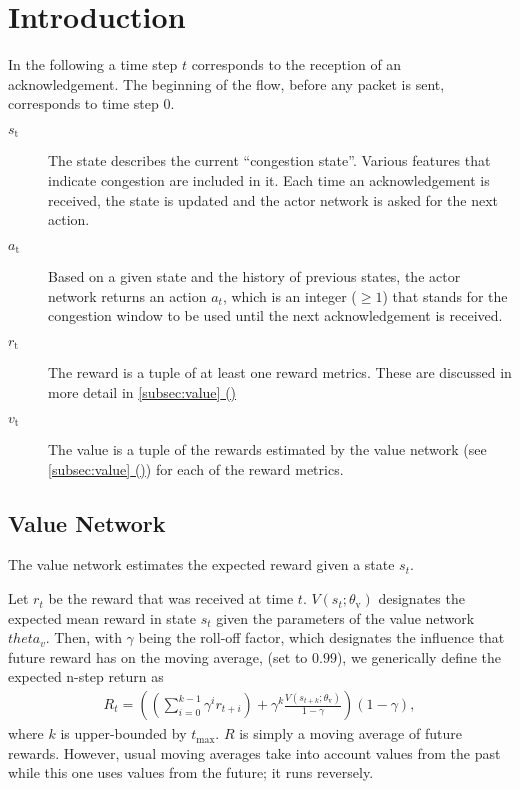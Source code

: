 \documentclass[sigconf]{acmart}
\newcommand*{\fullref}[1]{\hyperref[{#1}]{\autoref*{#1} (\nameref*{#1})}} %
\begin{document}




\maketitle

\section{Introduction}

In the following a time step $t$ corresponds to the reception of an acknowledgement. The beginning of the flow, before any packet is sent, corresponds to time step $0$.

\begin{description}
\item[$\textit{s}_\text{t}$] The state  describes the current ``congestion state''. Various features that indicate congestion are included in it. Each time an acknowledgement is received, the state is updated and the actor network is asked for the next action. 
\item[$\textit{a}_\text{t}$] Based on a given state and the history of previous states, the actor network returns an action $a_t$, which is an integer ($\geq 1$) that stands for the congestion window to be used until the next acknowledgement is received. 
\item[$\textit{r}_\text{t}$] The reward is a tuple of at least one reward metrics. These are discussed in more detail in \fullref{subsec:value}
\item[$\textit{v}_\text{t}$] The value is a tuple of the rewards estimated by the value network (see \fullref{subsec:value}) for each of the reward metrics. 
\end{description}

\subsection{Value Network}
\label{subsec:value}

The value network estimates the expected reward given a state $s_t$.

Let $r_t$ be the reward that was received at time $t$. $V(s_t; \theta_\text{v})$ designates the expected mean reward in state $s_t$ given the parameters of the value network $theta_v$. Then, with $\gamma$ being the roll-off factor, which designates the influence that future reward has on the moving average, (set to $0.99$), we generically define the expected n-step return as 
\begin{align*}
R_t = \left(\left(\sum_{i=0}^{k-1} \gamma^ir_{t+i}\right) + \gamma^k \frac{V(s_{t+k}; \theta_\text{v})}{1-\gamma}\right)\left(1-\gamma\right),
\end{align*}
where $k$ is upper-bounded by $t_\text{max}$. $R$ is simply a moving average of future rewards. However, usual moving averages take into account values from the past while this one uses values from the future; it runs reversely. 
\end{document}
